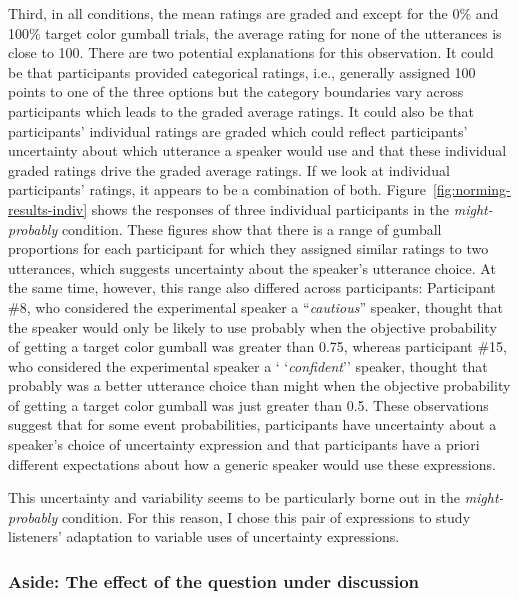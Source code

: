 Third, in all conditions, the mean ratings are graded and except for the 0\% and 100\% target color gumball trials, the average rating for none of the
utterances is close to 100. There are two potential explanations for this observation. It could be that participants provided categorical ratings, i.e.,
generally assigned 100 points to one of the three options but the category boundaries vary across participants which leads to the graded average ratings.
It could also be that participants' individual ratings are graded which could reflect participants' uncertainty about which utterance a speaker would use 
and that these individual graded ratings drive the  graded average ratings. If we look at individual participants' ratings, it appears to be a combination of both.
Figure~\ref{fig:norming-results-indiv} shows the responses of three individual participants in the \emph{might-probably} condition. These figures show that there 
is a range of gumball proportions for each participant for which they assigned similar ratings to two utterances, which suggests uncertainty about the speaker's 
utterance choice. At the same time, however, this range also differed across participants: Participant \#8, who considered the experimental speaker a 
``\textit{cautious}'' speaker, thought that the speaker would only be likely to use {\sc probably} 
when the objective probability of getting a target color gumball was greater than 0.75, whereas participant \#15, who considered the experimental speaker a `
`\textit{confident}'' speaker, thought that  {\sc probably} was a better utterance choice than {\sc might} 
when the objective probability of getting a target color gumball was just greater than 0.5. These observations suggest that for some event probabilities, participants have uncertainty  about a 
speaker's choice of uncertainty expression and that participants have a priori different expectations about how a generic speaker would use these expressions.

This uncertainty and variability seems to be particularly borne out in the \emph{might-probably} condition. For this reason, I chose this pair of expressions
to study listeners' adaptation to variable uses of uncertainty expressions.

\subsubsection{Aside: The effect of the question under discussion}

